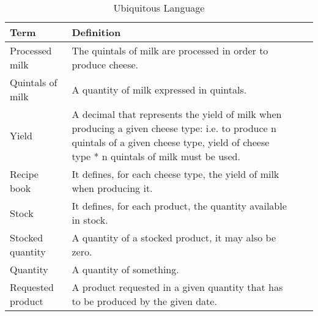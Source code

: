 \begin{table}[H]
    \centering
    \begin{tabular}{|p{}|*{3}{>{\arraybackslash}p{}|}}
        \hline
        Term              & Definition                                                                                                                                                                                 \\ \hline
        Processed milk    & The quintals of milk are processed in order to produce cheese.                                                                                                                             \\ \hline
        Quintals of milk  & A quantity of milk expressed in quintals.                                                                                                                                                  \\ \hline
        Yield             & A decimal that represents the yield of milk when producing a given cheese type: i.e. to produce n quintals of a given cheese type, yield of cheese type * n quintals of milk must be used. \\ \hline
        Recipe book       & It defines, for each cheese type, the yield of milk when producing it.                                                                                                                     \\ \hline
        Stock             & It defines, for each product, the quantity available in stock.                                                                                                                             \\ \hline
        Stocked quantity  & A quantity of a stocked product, it may also be zero.                                                                                                                                      \\ \hline
        Quantity          & A quantity of something.                                                                                                                                                                   \\ \hline
        Requested product & A product requested in a given quantity that has to be produced by the given date.                                                                                                         \\ \hline
    \end{tabular}
    \caption{Ubiquitous Language}
\end{table}

